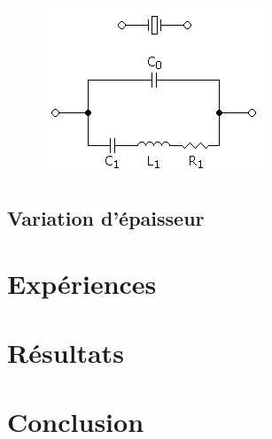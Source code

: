 \documentclass[a4paper,10pt]{article}
\begin{document}
\begin{multicols}{2}
\begin{figure}
    \centering
    \includegraphics[width=\linewidth]{Quartz_crystal_equivalent.png}
    \label{fig:my_label}
\end{figure}



\subsection{Variation d'épaisseur}




\section{Expériences}

\section{Résultats}

\section{Conclusion}


\end{multicols}
\end{document}
